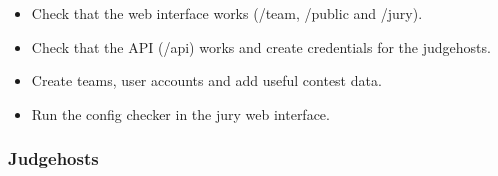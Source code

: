 \documentclass[a4paper,10pt,english,openany]{sphinxmanual}
\begin{document}
\begin{itemize}
\item {} 
\sphinxAtStartPar
Check that the web interface works (/team, /public and /jury).

\item {} 
\sphinxAtStartPar
Check that the API (/api) works and create credentials for the judgehosts.

\item {} 
\sphinxAtStartPar
Create teams, user accounts and add useful contest data.

\item {} 
\sphinxAtStartPar
Run the config checker in the jury web interface.

\end{itemize}


\subsubsection{Judgehosts}
\end{document}
